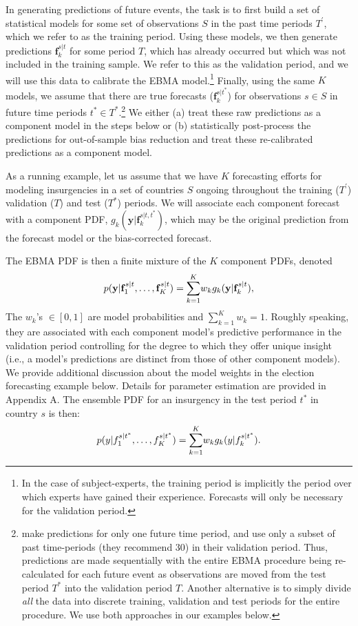 \documentclass[12pt,fullpage,endnotes]{article}
\newcommand{\note}[1]{\footnote{ #1 \vspace{4 mm}}}
\begin{document}
In generating predictions of future events, the task is to first build
a set of statistical models for some set of observations $S$ in the
past time periods $T^{\prime}$, which we refer to as the training
period.  Using these models, we then generate predictions
$\mathbf{f}^{s|t}_k$ for some period $T$, which has already occurred
but which was not included in the training sample.  We refer to this
as the validation period, and we will use this data to calibrate the
EBMA model.\note{In the case of subject-experts, the training period
  is implicitly the period over which experts have gained their
  experience.  Forecasts will only be necessary for the validation
  period.}  Finally, using the same $K$ models, we assume that there
are true forecasts ($\mathbf{f}_k^{s|t^\ast}$) for observations $s \in
S$ in future time periods $t^\ast \in
T^*$.\note{\citet{Sloughter:2007} make predictions for only one future
  time period, and use only a subset of past time-periods (they
  recommend 30) in their validation period. Thus, predictions are made
  sequentially with the entire EBMA procedure being re-calculated for
  each future event as observations are moved from the test period
  $T^\ast$ into the validation period $T$. Another alternative is to
  simply divide \textit{all} the data into discrete training, validation and
  test periods for the entire procedure.  We use both approaches in
  our examples below.}  We either (a) treat these raw predictions as a
component model in the steps below or (b) statistically post-process
the predictions for out-of-sample bias reduction and treat these
re-calibrated predictions as a component model.

As a running example, let us assume that we have $K$ forecasting
efforts for modeling insurgencies in a set of countries $S$ ongoing
throughout the training ($T^{\prime}$) validation ($T$) and test
($T^\ast$) periods.  We will associate each component forecast with a
component PDF, $g_k(\mathbf{y}|\mathbf{f}_k^{s|t, t^\ast})$, which may
be the original prediction from the forecast model or the
bias-corrected forecast.


The EBMA PDF is then a finite mixture of the $K$ component PDFs,
denoted
\begin{equation}
\small
\label{BMA-eq}
p(\mathbf{y}|\mathbf{f}_1^{s|t}, \ldots, \mathbf{f}_K^{s|t})=\overset{K}{\underset{k=1}{\sum}} w_k
g_k(\mathbf{y}|\mathbf{f}_k^{s|t}),
\end{equation}
\noindent The $w_k$'s $\in [0,1]$ are model probabilities and
$\sum_{k=1}^Kw_k=1$.  Roughly speaking, they are associated with each
component model's predictive performance in the validation period
controlling for the degree to which they offer unique insight (i.e.,
a model's predictions are distinct from those of other component models).
We provide additional discussion about the model weights in the
election forecasting example below.  Details for parameter estimation
are provided in Appendix A.  The ensemble PDF for an insurgency in the
test period $t^\ast$ in country $s$ is then:
\begin{equation}
\label{BMA-eq2}
\small
p(y|f_{1}^{s|t^\ast}, \ldots,
f_{K}^{s|t^\ast})=\overset{K}{\underset{k=1}{\sum}} w_k
g_k(y|f_{k}^{s|t^*}).
\end{equation}
\end{document}
